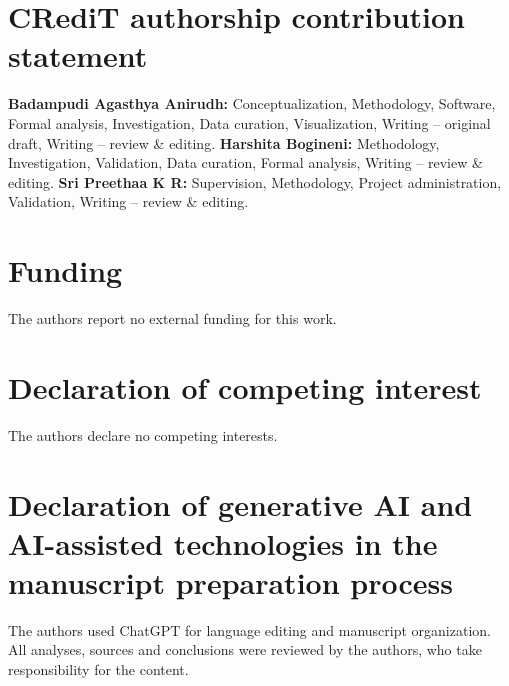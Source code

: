 \documentclass[a4paper,fleqn]{cas-sc}
\begin{document}
\section*{CRediT authorship contribution statement}
\textbf{Badampudi Agasthya Anirudh:} Conceptualization, Methodology, Software, Formal analysis, Investigation, Data curation, Visualization, Writing -- original draft, Writing -- review \& editing. \textbf{Harshita Bogineni:} Methodology, Investigation, Validation, Data curation, Formal analysis, Writing -- review \& editing. \textbf{Sri Preethaa K R:} Supervision, Methodology, Project administration, Validation, Writing -- review \& editing.

\section*{Funding}
The authors report no external funding for this work.

\section*{Declaration of competing interest}
The authors declare no competing interests.

\section*{Declaration of generative AI and AI-assisted technologies in the manuscript preparation process}
The authors used ChatGPT for language editing and manuscript organization. All analyses, sources and conclusions were reviewed by the authors, who take responsibility for the content.


\clearpage


\end{document}

